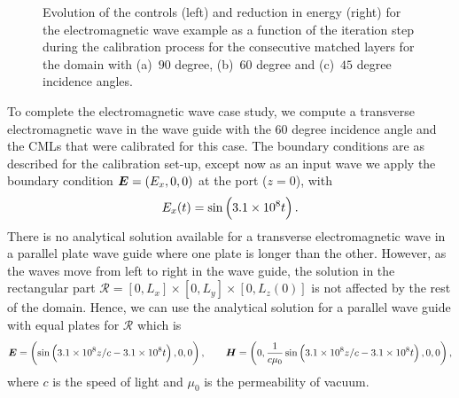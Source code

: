\documentclass[a4paper]{article}
\renewcommand{\vec}{\boldsymbol}
\begin{document}
\begin{figure}
{
}   \caption{Evolution of the controls (left) and reduction in energy
    (right) for the electromagnetic wave example as a function of the
    iteration step during the calibration process for the consecutive
    matched layers for the domain with (a)~$90$ degree, (b)~$60$
    degree and (c)~$45$ degree incidence angles.}
  \label{fig:em_historyall}
\end{figure}

To complete the electromagnetic wave case study, we compute a
transverse electromagnetic wave in the wave guide with the $60$ degree
incidence angle and the CMLs that were calibrated for this case.  The
boundary conditions are as described for the calibration set-up,
except now as an input wave we apply the boundary condition $\vec{E} =
\del{E_x, 0, 0}$ at the port ($z = 0$), with
\begin{equation}
  E_x(t) = \sin\del{3.1 \times 10^{8} t}.
\end{equation}
There is no analytical solution available for a transverse
electromagnetic wave in a parallel plate wave guide where one plate is
longer than the other.  However, as the waves move from left to right
in the wave guide, the solution in the rectangular part $\mathcal{R} =
[0, L_{x}] \times [0, L_{y}] \times [0, L_{z}(0)]$ is not affected by
the rest of the domain. Hence, we can use the analytical solution for
a parallel wave guide with equal plates for $\mathcal{R}$ which is
\begin{equation}
  \vec{E} = \del{\sin\del{3.1 \times 10^{8} z/c - 3.1 \times 10^{8} t}, 0,
  0}, \qquad
  \vec{H} = \del{0, \frac{1}{c\mu_0} \sin\del{3.1 \times 10^{8} z/c - 3.1
  \times 10^{8}
      t}, 0, 0},
  \label{eq:emreference}
\end{equation}
where $c$ is the speed of light and $\mu_0$ is the permeability of
vacuum.
\end{document}
